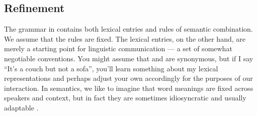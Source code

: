 \documentclass[leqno,12pt]{article}
\begin{document}

\subsection{Refinement}\label{sec:refine}


The grammar in  contains both lexical entries and
rules of semantic combination. We assume that the rules are fixed.
The lexical entries, on the other hand, are merely a starting point
for linguistic communication --- a set of somewhat negotiable
conventions. You might assume that  and  are
synonymous, but if I say ``It's a couch but not a sofa'', you'll learn
something about my lexical representations and perhaps adjust your own
accordingly for the purposes of our interaction. In semantics, we like
to imagine that word meanings are fixed across speakers and context,
but in fact they are sometimes idiosyncratic and usually adaptable
\citep{Clark97}. 

%
\end{document}
